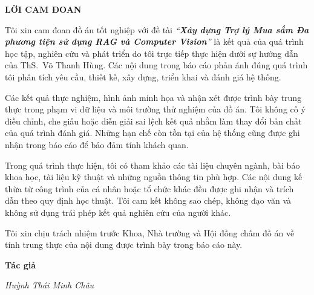 \newpage
\begin{center}
    \textbf{\Large LỜI CAM ĐOAN}
\end{center}

Tôi xin cam đoan đồ án tốt nghiệp với đề tài
\textit{\enquote{\textbf{Xây dựng Trợ lý Mua sắm Đa phương tiện sử dụng RAG và Computer Vision}}}
là kết quả của quá trình học tập, nghiên cứu và phát triển do tôi trực tiếp thực hiện dưới sự hướng dẫn của ThS.~Võ Thanh Hùng. Các nội dung trong báo cáo phản ánh đúng quá trình tôi phân tích yêu cầu, thiết kế, xây dựng, triển khai và đánh giá hệ thống.

Các kết quả thực nghiệm, hình ảnh minh họa và nhận xét được trình bày trung thực trong phạm vi dữ liệu và môi trường thử nghiệm của đồ án. Tôi không cố ý điều chỉnh, che giấu hoặc diễn giải sai lệch kết quả nhằm làm thay đổi bản chất của quá trình đánh giá. Những hạn chế còn tồn tại của hệ thống cũng được ghi nhận trong báo cáo để bảo đảm tính khách quan.

Trong quá trình thực hiện, tôi có tham khảo các tài liệu chuyên ngành, bài báo khoa học, tài liệu kỹ thuật và những nguồn thông tin phù hợp. Các nội dung kế thừa từ công trình của cá nhân hoặc tổ chức khác đều được ghi nhận và trích dẫn theo quy định học thuật. Tôi cam kết không sao chép, không đạo văn và không sử dụng trái phép kết quả nghiên cứu của người khác.

Tôi xin chịu trách nhiệm trước Khoa, Nhà trường và Hội đồng chấm đồ án về tính trung thực của nội dung được trình bày trong báo cáo này.

\vspace{1cm}

\par\hfill\textbf{Tác giả}

\par\hfill\textit{Huỳnh Thái Minh Châu}
\newpage

